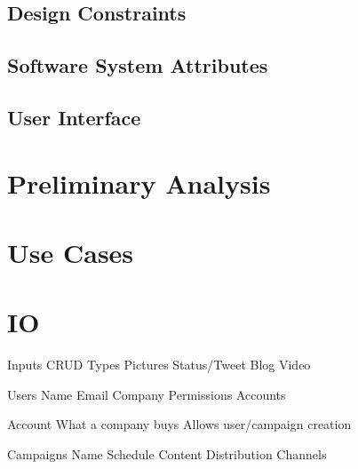 \documentclass{article}
\begin{document}
	\subsection{Design Constraints}
	\subsection{Software System Attributes}
	\subsection{User Interface}

\section{Preliminary Analysis}

\section{Use Cases}

\section{IO}

Inputs
  CRUD
  Types
    Pictures
    Status/Tweet
    Blog
    Video

Users
  Name
  Email
  Company
  Permissions
  Accounts
    
Account
  What a company buys
  Allows user/campaign creation
  
Campaigns
  Name
  Schedule
  Content
    Distribution Channels
\end{document}
